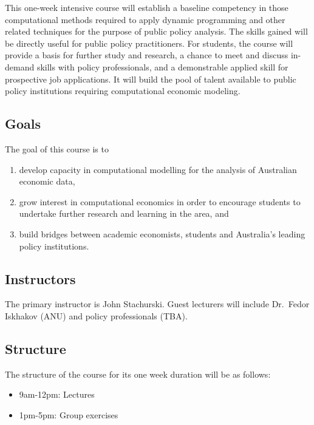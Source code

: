 \documentclass[12pt]{article}
\numberwithin{equation}{section}		%
\numberwithin{table}{section}				%
\begin{document}
This one-week intensive course will establish a baseline competency in
those computational methods required to apply dynamic programming and other
related techniques for the purpose of public
policy analysis. The skills gained will be
directly useful for public policy practitioners. For students, the course will
provide a basis for further study and research, a chance to meet and discuss
in-demand skills with policy professionals, and a demonstrable
applied skill for prospective job applications. It will build the
pool of talent available to public policy institutions requiring computational
economic modeling.



\subsection*{Goals}

The goal of this course is to 
%
\begin{enumerate}
    \item develop capacity in computational modelling for the analysis of Australian economic data,
    \item grow interest in computational economics in order to encourage students to
        undertake further research and learning in the area, and 
    \item build bridges between academic economists, students and Australia's
        leading policy institutions.
\end{enumerate}



\subsection*{Instructors}

The primary instructor is John Stachurski.  Guest lecturers will include
Dr.\ Fedor Iskhakov (ANU) and policy professionals (TBA).


\subsection*{Structure}

The structure of the course for its one week duration will be as follows:

\begin{itemize}
    \item 9am-12pm: Lectures
    \item 1pm-5pm: Group exercises 
\end{itemize}
\end{document}
